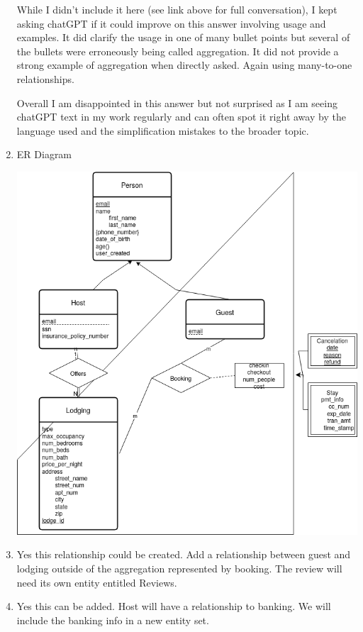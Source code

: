\documentclass[11pt]{article}
\begin{document}
\begin{enumerate}
While I didn't include it here (see link above for full conversation), I kept asking chatGPT if it could improve on this answer involving usage and examples.  It did clarify the usage in one of many bullet points but several of the bullets were erroneously being called aggregation.  It did not provide a strong example of aggregation when directly asked.  Again using many-to-one relationships.

Overall I am disappointed in this answer but not surprised as I am seeing chatGPT text in my work regularly and can often spot it right away by the language used and the simplification mistakes to the broader topic.

\item ER Diagram

\includegraphics[width = \textwidth]{og.png}

\item Yes this relationship could be created.  Add a relationship between guest and lodging outside of the aggregation represented by booking.  The review will need its own entity entitled Reviews. 

\item Yes this can be added.  Host will have a relationship to banking.  We will include the banking info in a new entity set.



\end{enumerate}
\end{document}

